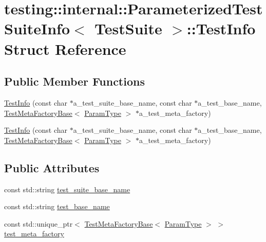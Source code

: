 \hypertarget{structtesting_1_1internal_1_1_parameterized_test_suite_info_1_1_test_info}{}\section{testing\+::internal\+::Parameterized\+Test\+Suite\+Info$<$ Test\+Suite $>$\+::Test\+Info Struct Reference}
\label{structtesting_1_1internal_1_1_parameterized_test_suite_info_1_1_test_info}
\subsection*{Public Member Functions}
\begin{DoxyCompactItemize}
\item 
\mbox{\hyperlink{structtesting_1_1internal_1_1_parameterized_test_suite_info_1_1_test_info_ad48e887f53f0fcee13f2213b202ac989}{Test\+Info}} (const char $\ast$a\+\_\+test\+\_\+suite\+\_\+base\+\_\+name, const char $\ast$a\+\_\+test\+\_\+base\+\_\+name, \mbox{\hyperlink{classtesting_1_1internal_1_1_test_meta_factory_base}{Test\+Meta\+Factory\+Base}}$<$ \mbox{\hyperlink{classtesting_1_1internal_1_1_parameterized_test_suite_info_a10761bd750a6820a8d8d2c654b10fe54}{Param\+Type}} $>$ $\ast$a\+\_\+test\+\_\+meta\+\_\+factory)
\item 
\mbox{\hyperlink{structtesting_1_1internal_1_1_parameterized_test_suite_info_1_1_test_info_ad48e887f53f0fcee13f2213b202ac989}{Test\+Info}} (const char $\ast$a\+\_\+test\+\_\+suite\+\_\+base\+\_\+name, const char $\ast$a\+\_\+test\+\_\+base\+\_\+name, \mbox{\hyperlink{classtesting_1_1internal_1_1_test_meta_factory_base}{Test\+Meta\+Factory\+Base}}$<$ \mbox{\hyperlink{classtesting_1_1internal_1_1_parameterized_test_suite_info_a10761bd750a6820a8d8d2c654b10fe54}{Param\+Type}} $>$ $\ast$a\+\_\+test\+\_\+meta\+\_\+factory)
\end{DoxyCompactItemize}
\subsection*{Public Attributes}
\begin{DoxyCompactItemize}
\item 
const std\+::string \mbox{\hyperlink{structtesting_1_1internal_1_1_parameterized_test_suite_info_1_1_test_info_aa66b8784771455cb1ec38636a9c4fbb7}{test\+\_\+suite\+\_\+base\+\_\+name}}
\item 
const std\+::string \mbox{\hyperlink{structtesting_1_1internal_1_1_parameterized_test_suite_info_1_1_test_info_a1c3faeadf1be6b9fd32f0321d9bfafce}{test\+\_\+base\+\_\+name}}
\item 
const std\+::unique\+\_\+ptr$<$ \mbox{\hyperlink{classtesting_1_1internal_1_1_test_meta_factory_base}{Test\+Meta\+Factory\+Base}}$<$ \mbox{\hyperlink{classtesting_1_1internal_1_1_parameterized_test_suite_info_a10761bd750a6820a8d8d2c654b10fe54}{Param\+Type}} $>$ $>$ \mbox{\hyperlink{structtesting_1_1internal_1_1_parameterized_test_suite_info_1_1_test_info_af12e90fe3691d87f911563e291218d85}{test\+\_\+meta\+\_\+factory}}
\end{DoxyCompactItemize}


